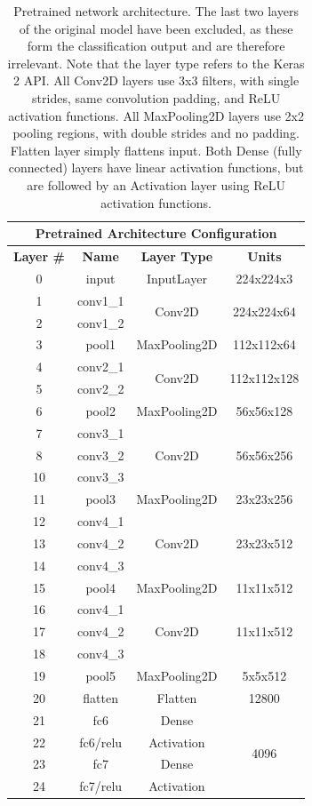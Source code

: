 \begin{table}[h!]
\begin{center}
\begin{tabular}{|c|c|c|c|}
\hline
\multicolumn{4}{|c|}{Pretrained Architecture Configuration} \\ \hline
\textbf{Layer \#} & \textbf{Name} & \textbf{Layer Type} & \textbf{Units} \\ \hline
0 & input & InputLayer & 224x224x3  \\ \hline
1 & conv1\_1 & \multirow{2}{*}{Conv2D} & \multirow{2}{*}{224x224x64} \\ \cline{1-2}
2 & conv1\_2 & & \\ \hline
3 & pool1 & MaxPooling2D & 112x112x64 \\ \hline
4 & conv2\_1 & \multirow{2}{*}{Conv2D} & \multirow{2}{*}{112x112x128} \\ \cline{1-2}
5 & conv2\_2 & & \\ \hline
6 & pool2 & MaxPooling2D & 56x56x128 \\ \hline
7 & conv3\_1 & \multirow{3}{*}{Conv2D} & \multirow{3}{*}{56x56x256} \\ \cline{1-2}
8 & conv3\_2 & & \\ \cline{1-2}
10 & conv3\_3 & & \\ \hline
11 & pool3 & MaxPooling2D & 23x23x256 \\ \hline
12 & conv4\_1 & \multirow{3}{*}{Conv2D} & \multirow{3}{*}{23x23x512} \\ \cline{1-2}
13 & conv4\_2 & & \\ \cline{1-2}
14 & conv4\_3 & & \\ \hline
15 & pool4 & MaxPooling2D & 11x11x512 \\ \hline
16 & conv4\_1 & \multirow{3}{*}{Conv2D} & \multirow{3}{*}{11x11x512} \\ \cline{1-2}
17 & conv4\_2 & & \\ \cline{1-2}
18 & conv4\_3 & & \\ \hline
19 & pool5 & MaxPooling2D & 5x5x512 \\ \hline
20 & flatten & Flatten & 12800 \\ \hline
21 & fc6 & Dense & \multirow{4}{*}{4096} \\ \cline{1-3}
22 & fc6/relu & Activation & \\ \cline{1-3}
23 & fc7 & Dense & \\ \cline{1-3}
24 & fc7/relu & Activation & \\ \hline
\end{tabular}
\end{center}
\caption[Pretrained network architecture]{Pretrained network architecture. The last two layers of the original model have been excluded, as these form the classification output and are therefore irrelevant. Note that the layer type refers to the Keras 2 API. All Conv2D layers use 3x3 filters, with single strides, same convolution padding, and ReLU activation functions. All MaxPooling2D layers use 2x2 pooling regions, with double strides and no padding. Flatten layer simply flattens input. Both Dense (fully connected) layers have linear activation functions, but are followed by an Activation layer using ReLU activation functions.}
\label{tab:vggface-arch}
\end{table}

